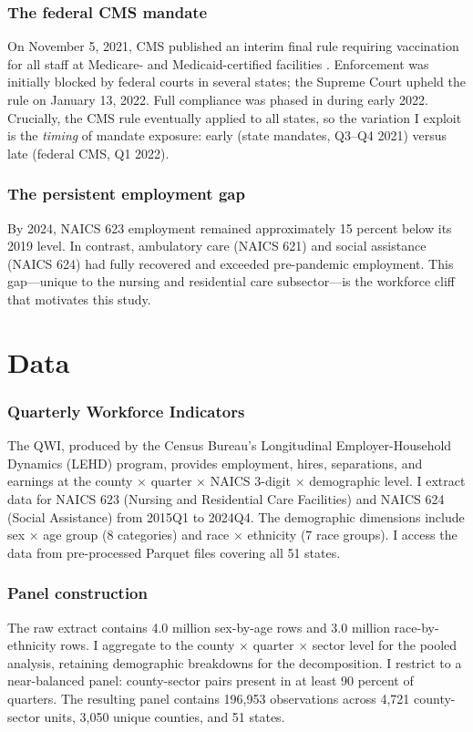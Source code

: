 \documentclass[12pt]{article}
\begin{document}
\subsubsection*{The federal CMS mandate} On November 5, 2021, CMS published an interim final rule requiring vaccination for all staff at Medicare- and Medicaid-certified facilities \citep{cms2021rule}. Enforcement was initially blocked by federal courts in several states; the Supreme Court upheld the rule on January 13, 2022. Full compliance was phased in during early 2022. Crucially, the CMS rule eventually applied to all states, so the variation I exploit is the \emph{timing} of mandate exposure: early (state mandates, Q3--Q4 2021) versus late (federal CMS, Q1 2022).

\subsubsection*{The persistent employment gap} By 2024, NAICS 623 employment remained approximately 15 percent below its 2019 level. In contrast, ambulatory care (NAICS 621) and social assistance (NAICS 624) had fully recovered and exceeded pre-pandemic employment. This gap---unique to the nursing and residential care subsector---is the workforce cliff that motivates this study.

\section{Data}

\subsubsection*{Quarterly Workforce Indicators} The QWI, produced by the Census Bureau's Longitudinal Employer-Household Dynamics (LEHD) program, provides employment, hires, separations, and earnings at the county $\times$ quarter $\times$ NAICS 3-digit $\times$ demographic level. I extract data for NAICS 623 (Nursing and Residential Care Facilities) and NAICS 624 (Social Assistance) from 2015Q1 to 2024Q4. The demographic dimensions include sex $\times$ age group (8 categories) and race $\times$ ethnicity (7 race groups). I access the data from pre-processed Parquet files covering all 51 states.

\subsubsection*{Panel construction} The raw extract contains 4.0 million sex-by-age rows and 3.0 million race-by-ethnicity rows. I aggregate to the county $\times$ quarter $\times$ sector level for the pooled analysis, retaining demographic breakdowns for the decomposition. I restrict to a near-balanced panel: county-sector pairs present in at least 90 percent of quarters. The resulting panel contains 196,953 observations across 4,721 county-sector units, 3,050 unique counties, and 51 states.
\end{document}
